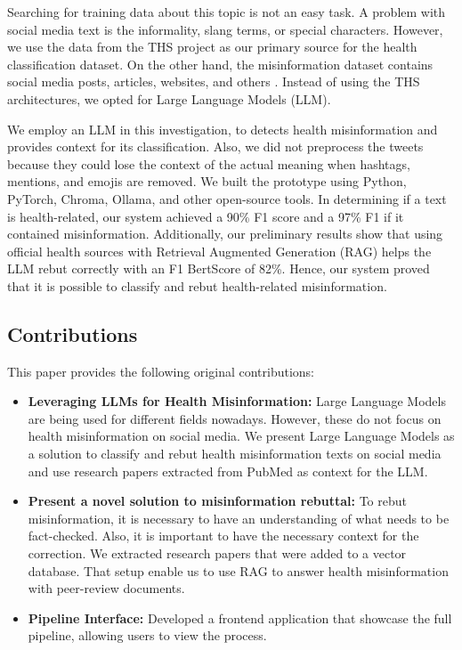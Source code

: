 Searching for training data about this topic is not an easy task. A problem with social media text is the informality, slang terms, or special characters. However, we use the
data from the THS project as our primary source for the health classification dataset. On the other hand, the misinformation dataset contains social media posts, articles,
websites, and others \cite{stephencrone2022,coviddata,covidunesco}. Instead of using the THS architectures, we opted for Large Language Models (LLM). 

We employ an LLM in this investigation, to detects health misinformation and provides context for its classification. Also, we did not preprocess the tweets because they could lose the context of the actual meaning when hashtags, mentions, and emojis are removed. We built the prototype using Python, PyTorch, Chroma, Ollama, and other open-source tools. In determining if a text is health-related, our system achieved a 90\% F1 score and a 97\% F1 if it contained misinformation. Additionally, our preliminary results show that using official health sources with Retrieval Augmented Generation (RAG) helps the LLM rebut correctly with an F1 BertScore of 82\%. Hence, our system proved that it is possible to classify and rebut health-related misinformation. 

\subsection{Contributions}
This paper provides the following original contributions:
\begin{itemize}
	\item{\textbf{Leveraging LLMs for Health Misinformation:}} Large Language Models are being used for different fields nowadays. However, these do not focus on health misinformation on social media. We present Large Language Models as a solution to classify and rebut health misinformation texts on social media and use research papers extracted from PubMed as context for the LLM.
	\item{\textbf{Present a novel solution to misinformation rebuttal:}} To rebut misinformation, it is necessary to have an understanding of what needs to be fact-checked. Also, it is important to have the necessary context for the correction. We extracted research papers that were added to a vector database. That setup enable us to use RAG to answer health misinformation with peer-review documents.
	\item{\textbf{Pipeline Interface:}} Developed a frontend application that showcase the full pipeline, allowing users to view the process.

\end{itemize}


